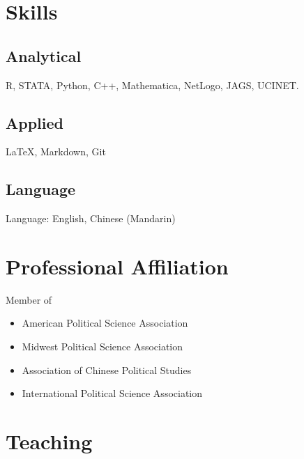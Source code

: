\documentclass[11pt, a4paper]{awesome-cv}
\providecommand{\tightlist}{%
	\setlength{\itemsep}{0pt}\setlength{\parskip}{0pt}}
\begin{document}
\hypertarget{skills}{%
\section{Skills}\label{skills}}

\hypertarget{analytical}{%
\subsection{Analytical}\label{analytical}}

R, STATA, Python, C++, Mathematica, NetLogo, JAGS, UCINET.

\hypertarget{applied}{%
\subsection{Applied}\label{applied}}

LaTeX, Markdown, Git

\hypertarget{language}{%
\subsection{Language}\label{language}}

Language: English, Chinese (Mandarin)

\hypertarget{professional-affiliation}{%
\section{Professional Affiliation}\label{professional-affiliation}}

Member of

\begin{itemize}
\tightlist
\item
  American Political Science Association
\item
  Midwest Political Science Association
\item
  Association of Chinese Political Studies
\item
  International Political Science Association
\end{itemize}

\hypertarget{teaching}{%
\section{Teaching}\label{teaching}}
\end{document}
